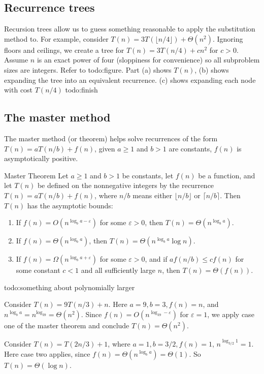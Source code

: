 \subsection{Recurrence trees}
Recursion trees allow us to guess something reasonable to apply the substitution method to. For example, consider $T(n)=3T(\lfloor n /4 \rfloor)+\Theta(n^2)$. Ignoring floors and ceilings, we create a tree for $T(n)=3T(n /4)+cn^2$ for $c>0$. Assume $n$ is an exact power of four (sloppiness for convenience) so all subproblem sizes are integers. Refer to {\color{red}todo:figure}. Part (a) shows  $T(n)$, (b) shows expanding the tree into an equivalent recurrence. (c) shows expanding each node with cost $T(n /4)$  {\color{red}todo:finish} 
\subsection{The master method}
The master method (or theorem) helps solve recurrences of the form $T(n)=a T(n /b) +f(n)$, given $a \geq 1$ and $b>1$ are constants, $f(n)$ is asymptotically positive.

\begin{namedthm}{Master Theorem} 
    Let $a\geq 1$ and $b>1$ be constants, let $f(n)$ be a function, and let $T(n)$ be defined on the nonnegative integers by the recurrence $T(n)=aT(n /b)+f(n)$, where $n /b$ means either $\lfloor n /b\rfloor$ or $\lceil n /b\rceil$. Then  $T(n)$ has the asymptotic bounds:
    \begin{enumerate}[label=(\arabic*)]
    \setlength\itemsep{-.2em}
\item If $f(n)=O(n ^{\log_b a - \varepsilon })$ for some $\varepsilon >0$, then $T(n)= \Theta (n ^{\log _ba})$.
\item If $f(n)=\Theta(n ^{\log_ba})$, then $T(n)=\Theta(n ^{\log_ba}\log n)$.
\item If $f(n)=\Omega(n ^{\log_ba +\varepsilon })$ for some $\varepsilon >0$, and if $af(n /b) \leq c f(n)$ for some constant $c<1$ and all sufficiently large $n$, then $T(n)=\Theta(f(n))$.
    \end{enumerate}
\end{namedthm}
{\color{red}todo:something about polynomially larger} 
\begin{example}
    Consider $T(n)=9T(n /3)+n$. Here $a=9,b=3,f(n)=n$, and $n ^{\log_ba}=n^{\log_39}=\Theta(n^2)$. Since $f(n)=O(n ^{\log_39-\varepsilon })$ for $\varepsilon =1$, we apply case one of the master theorem and conclude $T(n)=\Theta(n^2)$.
\end{example}
\begin{example}
    Consider $T(n)=T(2n /3)+1$, where $a=1, b=3 /2, f(n)=1$, $n ^{\log _{3/2}1}=1$. Here case two applies, since $f(n)=\Theta(n ^{\log_ba})=\Theta(1)$. So $T(n)=\Theta(\log n)$.
\end{example}
